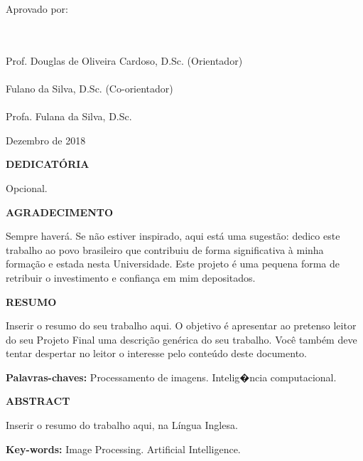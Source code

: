 {\begin{minipage}{0.9\textwidth}
	\begin{flushleft}
	Aprovado por:
	\end{flushleft}
\end{minipage}\\[1cm]

\center
\HRule \\
Prof. Douglas de Oliveira Cardoso, D.Sc. (Orientador) \\[0.4cm]
\HRule \\
Fulano da Silva, D.Sc. (Co-orientador)\\[0.4cm]
\HRule \\
Profa. Fulana da Silva, D.Sc.  \\[1.5cm]


\begin{center}
{Dezembro de 2018}
\end{center}


}



\newpage


\begin{center}
\textbf{\large DEDICATÓRIA}
\end{center}
      \vspace{0.5cm}

Opcional.
\newpage



\begin{center}
\textbf{\large  AGRADECIMENTO}
\end{center}
      \vspace{0.5cm}

Sempre haverá. Se não estiver inspirado, aqui está uma sugestão: dedico este trabalho ao povo brasileiro que contribuiu de forma significativa à minha formação e estada nesta Universidade. Este projeto é uma pequena forma de retribuir o investimento e confiança em mim depositados.
\newpage


\begin{center}
\textbf{\large RESUMO}
\end{center}
      \vspace{0.5cm}

Inserir o resumo do seu trabalho aqui. O objetivo é apresentar ao pretenso leitor do seu Projeto Final uma descrição genérica do seu trabalho. Você também deve tentar despertar no leitor o interesse pelo conteúdo deste documento.
\begin{flushleft}
{\bf Palavras-chaves:} Processamento de imagens. Intelig�ncia computacional.
\end{flushleft}

\newpage

\begin{center}
\textbf{\large ABSTRACT}
\end{center}
\vspace{0.5cm}

Inserir o resumo do trabalho aqui, na Língua Inglesa.


\begin{flushleft}
{\bf Key-words:} Image Processing. Artificial Intelligence.
\end{flushleft}
